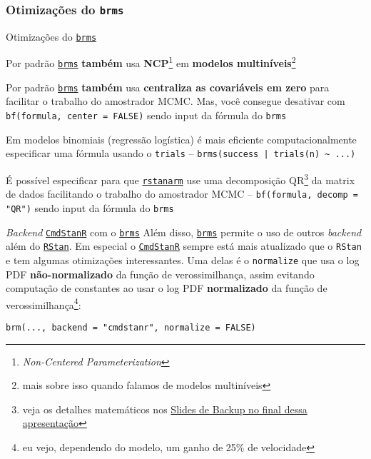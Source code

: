 \subsubsection{Otimizações do \texttt{brms}}
\begin{frame}{Otimizações do \href{https://paul-buerkner.github.io/brms/}{\texttt{brms}}}
	\small
	\begin{vfilleditems}
		\item Por padrão \href{https://paul-buerkner.github.io/brms/}{\texttt{brms}}
		\textbf{também} usa \textbf{NCP}\footnote{\textit{Non-Centered Parameterization}}
		em \textbf{modelos multiníveis}\footnote{mais sobre isso quando falamos de modelos multiníveis}
		\item Por padrão \href{https://paul-buerkner.github.io/brms/}{\texttt{brms}}
		\textbf{também} usa \textbf{centraliza as covariáveis em zero} para facilitar o trabalho do amostrador
		MCMC. Mas, você consegue desativar com \lstinline!bf(formula, center = FALSE)! sendo
		input da fórmula do \texttt{brms}
		\item Em modelos binomiais (regressão logística) é mais eficiente computacionalmente
		especificar uma fórmula usando o \lstinline!trials! --
		\lstinline!brms(success | trials(n) ~ ...)!
		\item É possível especificar para que \href{http://mc-stan.org/rstanarm/}{\texttt{rstanarm}}
		use uma decomposição QR\footnote{veja os detalhes matemáticos nos \hyperlink{appendixqr}{Slides de Backup no final dessa apresentação}}
		da matrix de dados facilitando o trabalho do amostrador MCMC
		-- \lstinline!bf(formula, decomp = "QR")! sendo input da fórmula do
		\texttt{brms}
	\end{vfilleditems}
\end{frame}

\begin{frame}[fragile]{\textit{Backend} \href{https://mc-stan.org/cmdstanr/}{\texttt{CmdStanR}} com o \href{https://paul-buerkner.github.io/brms/}{\texttt{brms}}}
	Além disso, \href{https://paul-buerkner.github.io/brms/}{\texttt{brms}} permite
	o uso de outros \textit{backend} além do \href{https://mc-stan.org/rstan/}{\texttt{RStan}}.
	\vfill
	Em especial o \href{https://mc-stan.org/cmdstanr/}{\texttt{CmdStanR}}
	sempre está mais atualizado que o \texttt{RStan} e tem algumas otimizações interessantes.
	Uma delas é o \lstinline!normalize! que usa o log PDF \textbf{não-normalizado} da função
	de verossimilhança, assim evitando computação de constantes ao usar o log PDF
	\textbf{normalizado} da função de verossimilhança\footnote{eu vejo, dependendo do modelo, um ganho de 25\% de velocidade}:
	\begin{lstlisting}
brm(..., backend = "cmdstanr", normalize = FALSE)
    \end{lstlisting}
\end{frame}

